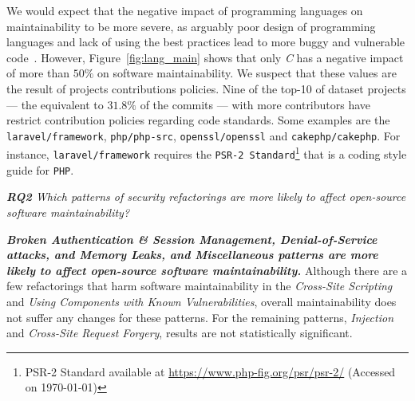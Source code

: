 \documentclass[sigconf,review]{acmart}
\begin{document}
We would expect that the negative impact of programming languages on
maintainability to be more severe, as arguably poor design of programming
languages and lack of using the best practices lead to more buggy and vulnerable
code~\cite{Ray:2017:LSP:3144574.3126905, 2019arXiv190110220B}. However,
Figure~\ref{fig:lang_main} shows that only \emph{C} has a negative impact of
more than $50\%$ on software maintainability. We suspect that these values are
the result of projects contributions policies. Nine of the top-10 of dataset projects  --- the
equivalent to $31.8\%$ of the commits ---
with more contributors have restrict contribution policies regarding code
standards. Some examples are the \texttt{laravel/framework},
\texttt{php/php-src}, \texttt{openssl/openssl} and \texttt{cakephp/cakephp}. For
instance, \texttt{laravel/framework} requires the \texttt{PSR-2
Standard}\footnote{PSR-2 Standard available at
\url{https://www.php-fig.org/psr/psr-2/} (Accessed on \today{})} that is a coding style guide for \texttt{PHP}.

\begin{framed}
\textit{\textbf{RQ2} Which patterns of security refactorings are more likely to
affect open-source software maintainability?}
\vspace{-0.1cm}
\end{framed}
\vspace{-0.1cm}

\textbf{\textit{Broken Authentication \& Session Management, Denial-of-Service
attacks, and Memory Leaks, and Miscellaneous patterns are more likely to affect
open-source software maintainability.}} Although there are a few refactorings
that harm software maintainability in the \emph{Cross-Site Scripting} and
\emph{Using Components with Known Vulnerabilities}, overall maintainability does
not suffer any changes for these patterns. For the remaining patterns,
\emph{Injection} and \emph{Cross-Site Request Forgery}, results are not
statistically significant.
\end{document}
